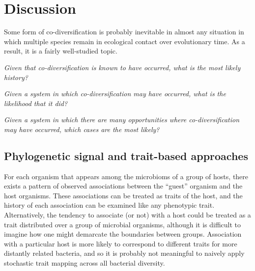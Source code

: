 \section{Discussion}

Some form of co-diversification is probably inevitable in almost any situation in which multiple species remain in ecological contact over evolutionary time. As a result, it is a fairly well-studied topic. 

{\em Given that co-diversification is known to have occurred, what is the most likely history?}

{\em Given a system in which co-diversification may have occurred, what is the likelihood that it did?}

{\em Given a system in which there are many opportunities where co-diversification may have occurred, which cases are the most likely?}

\subsection{Phylogenetic signal and trait-based approaches}





For each organism that appears among the microbioms of a group of hosts, there exists a pattern of observed associations between the ``guest'' organism and the host organisms. These associations can be treated as traits of the host, and the history of each association can be examined like any phenotypic trait. Alternatively, the tendency to associate (or not) with a host could be treated as a trait distributed over a group of microbial organisms, although it is difficult to imagine how one might demarcate the boundaries between groups. Association with a particular host is more likely to correspond to different traits for more distantly related bacteria, and so it is probably not meaningful to naively apply stochastic trait mapping across all bacterial diversity.

